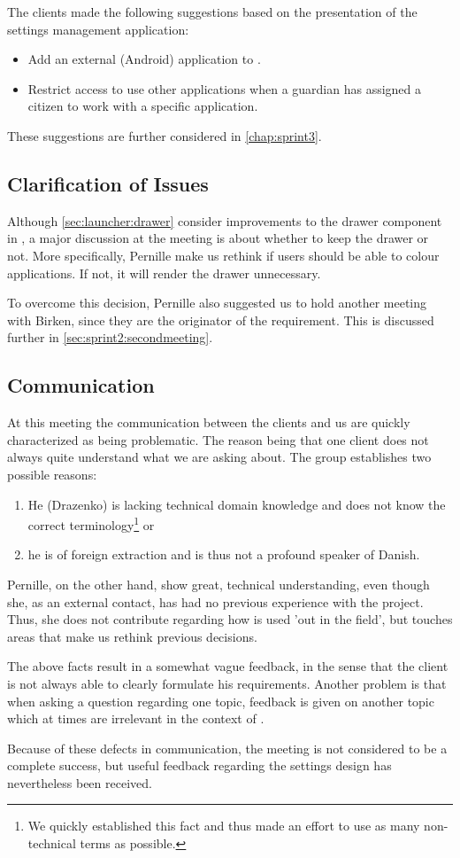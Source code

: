 The clients made the following suggestions based on the presentation of the settings management application:

\begin{itemize}
\item Add an external (Android) application to \launcher.
\item Restrict access to use other applications when a guardian has assigned a citizen to work with a specific application.
\end{itemize}

These suggestions are further considered in \cref{chap:sprint3}.

\subsection{Clarification of Issues}
Although \cref{sec:launcher:drawer} consider improvements to the drawer component in \giraf, a major discussion at the meeting is about whether to keep the drawer or not.
More specifically, Pernille make us rethink if users should be able to colour applications.
If not, it will render the drawer unnecessary.

To overcome this decision, Pernille also suggested us to hold another meeting with Birken, since they are the originator of the requirement.
This is discussed further in \cref{sec:sprint2:secondmeeting}.

\subsection{Communication}
At this meeting the communication between the clients and us are quickly characterized as being problematic.
The reason being that one client does not always quite understand what we are asking about.
The group establishes two possible reasons:
\begin{enumerate}
\item He (Drazenko) is lacking technical domain knowledge and does not know the correct terminology\footnote{We quickly established this fact and thus made an effort to use as many non-technical terms as possible.} or
\item he is of foreign extraction and is thus not a profound speaker of Danish.
\end{enumerate}
Pernille, on the other hand, show great, technical understanding, even though she, as an external contact, has had no previous experience with the \giraf project.
Thus, she does not contribute regarding how \giraf is used 'out in the field', but touches areas that make us rethink previous decisions.

The above facts result in a somewhat vague feedback, in the sense that the client is not always able to clearly formulate his requirements.
Another problem is that when asking a question regarding one topic, feedback is given on another topic which at times are irrelevant in the context of \launcher.

Because of these defects in communication, the meeting is not considered to be a complete success, but useful feedback regarding the settings design has nevertheless been received.